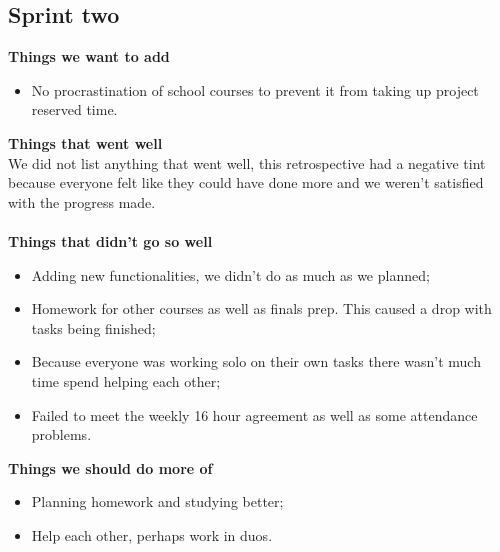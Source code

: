 \documentclass[12pt]{article}
\begin{document}
	\subsection{Sprint two}
		\textbf{Things we want to add}
	\begin{itemize}
		\item  No procrastination of school courses to prevent it from taking up project reserved time.
	\end{itemize}
	\textbf{Things that went well}\\
	We did not list anything that went well, this retrospective had a negative tint because everyone felt like they could have done more and we weren't satisfied with the progress made.\\
	\\\textbf{Things that didn't go so well}
	\begin{itemize}
		\item Adding new functionalities, we didn't do as much as we planned;
		\item Homework for other courses as well as finals prep. This caused a drop with tasks being finished;
		\item Because everyone was working solo on their own tasks there wasn't much time spend helping each other;
		\item Failed to meet the weekly 16 hour agreement as well as some attendance problems.
	\end{itemize}
	\textbf{Things we should do more of}
	\begin{itemize}
		\item Planning homework and studying better;
		\item Help each other, perhaps work in duos.
	\end{itemize}
\end{document}
